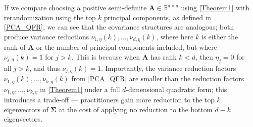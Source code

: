 \documentclass[11pt,twoside]{article}
\theoremstyle{definition}
\theoremstyle{remark}
\begin{document}
If we compare choosing a positive semi-definite $\mathbf{A} \in \mathbb{R}^{d \times d}$ using \cref{Theorem1} with rerandomization using the top $k$ principal components, as defined in \cref{PCA_QFR}, we can see that the covariance structures are analogous; both produce variance reductions $\nu_{1, \eta}(k), \ldots, \nu_{d, \eta}(k)$, where here $k$ is either the rank of $\mathbf{A}$ or the number of principal components included, but where $\nu_{j, \eta}(k) = 1$ for $j > k$. This is because when $\mathbf{A}$ has rank $k < d$, then $\eta_j = 0$ for all $j > k$, and thus $\nu_{j, \eta}(k) = 1$. Importantly, the variance reduction factors $\nu_{1,\eta}(k), \ldots, \nu_{k, \eta}(k)$ from \cref{PCA_QFR} are smaller than the reduction factors $\nu_{1,\eta}, \dots, \nu_{k, \eta}$ in \cref{Theorem1} under a full $d$-dimensional quadratic form; this introduces a trade-off --- practitioners gain more reduction to the top $k$ eigenvectors of $\mathbf{\Sigma}$ at the cost of applying no reduction to the bottom $d - k$ eigenvectors. 
\end{document}
